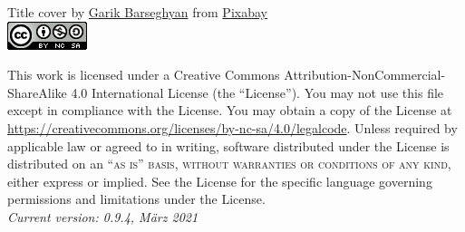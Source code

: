 \noindent Title cover by \href{https://pixabay.com/users/insspirito-1851261/?utm_source=link-attribution&amp;utm_medium=referral&amp;utm_campaign=image&amp;utm_content=1280089}{Garik Barseghyan} from \href{https://pixabay.com/?utm_source=link-attribution&amp;utm_medium=referral&amp;utm_campaign=image&amp;utm_content=1280089}{Pixabay}\\

\includegraphics[]{figures/index/license.png}

\noindent This work is licensed under a Creative Commons Attribution-NonCommercial-ShareAlike 4.0 International License (the ``License''). You may not use this file except in compliance with the License. You may obtain a copy of the License at \url{https://creativecommons.org/licenses/by-nc-sa/4.0/legalcode}. Unless required by applicable law or agreed to in writing, software distributed under the License is distributed on an \textsc{``as is'' basis, without warranties or conditions of any kind}, either express or implied. See the License for the specific language governing permissions and limitations under the License.\\ %

\noindent \textit{Current version: 0.9.4, März 2021} %
\newpage
{}
